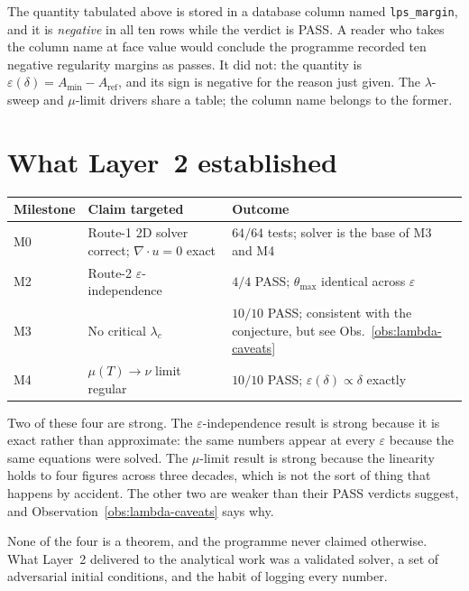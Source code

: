 \begin{obsv}
\label{obs:lps-margin-column}
The quantity tabulated above is stored in a database column named
\texttt{lps\_margin}, and it is \emph{negative} in all ten rows while the
verdict is \textsf{PASS}. A reader who takes the column name at face value
would conclude the programme recorded ten negative regularity margins as
passes. It did not: the quantity is
\(\varepsilon(\delta)=A_{\min}-A_{\mathrm{ref}}\), and its sign is negative
for the reason just given. The \(\lambda\)-sweep and \(\mu\)-limit drivers
share a table; the column name belongs to the former.
\end{obsv}

\section{What Layer~2 established}
\label{sec:layer2-summary}

\begin{center}
\small
\begin{tabular}{@{}l p{} p{}@{}}
\toprule
Milestone & Claim targeted & Outcome \\
\midrule
M0 & Route-1 2D solver correct; \(\nabla\cdot u=0\) exact & \(64/64\) tests;
  solver is the base of M3 and M4 \\
M2 & Route-2 \(\varepsilon\)-independence & \(4/4\) \textsf{PASS};
  \(\theta_{\max}\) identical across \(\varepsilon\) \\
M3 & No critical \(\lambda_c\) & \(10/10\) \textsf{PASS}; consistent with the
  conjecture, but see Obs.~\ref{obs:lambda-caveats} \\
M4 & \(\mu(T)\to\nu\) limit regular & \(10/10\) \textsf{PASS};
  \(\varepsilon(\delta)\propto\delta\) exactly \\
\bottomrule
\end{tabular}
\end{center}

\medskip
Two of these four are strong. The \(\varepsilon\)-independence result is
strong because it is exact rather than approximate: the same numbers appear at
every \(\varepsilon\) because the same equations were solved. The
\(\mu\)-limit result is strong because the linearity holds to four figures
across three decades, which is not the sort of thing that happens by accident.
The other two are weaker than their \textsf{PASS} verdicts suggest, and
Observation~\ref{obs:lambda-caveats} says why.

None of the four is a theorem, and the programme never claimed otherwise. What
Layer~2 delivered to the analytical work was a validated solver, a set of
adversarial initial conditions, and the habit of logging every number.

